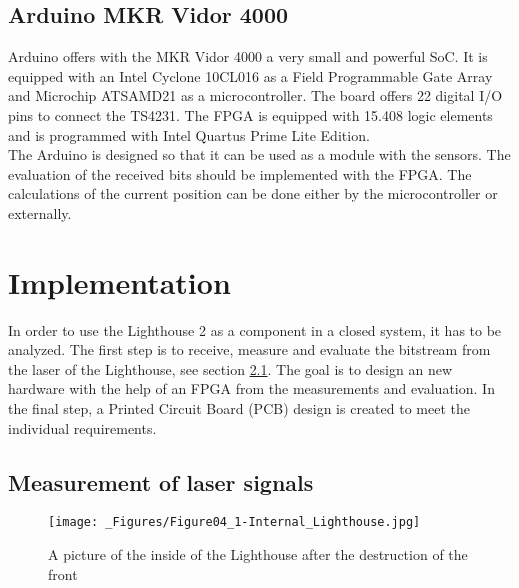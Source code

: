 \documentclass[a4paper,twoside, openright,12pt]{report}
\begin{document}
\section{Arduino MKR Vidor 4000}
\label{Section_Arduino}
Arduino offers with the MKR Vidor 4000 a very small and powerful SoC. It is equipped with an Intel Cyclone 10CL016 as a Field Programmable Gate Array and Microchip ATSAMD21 as a microcontroller. The board offers 22 digital I/O pins to connect the TS4231. The FPGA is equipped with 15.408 logic elements and is programmed with Intel Quartus Prime Lite Edition. \\
The Arduino is designed so that it can be used as a module with the sensors. The evaluation of the received bits should be implemented with the FPGA. The calculations of the current position can be done either by the microcontroller or externally. \cite{.e} \cite{IntelCorporation.} \cite{IntelCorporation.2017} \cite{MicrochipTechnologyInc..2018}


\chapter{Implementation}
\label{Chapter_Implementation}
In order to use the Lighthouse 2 as a component in a closed system, it has to be analyzed. The first step is to receive, measure and evaluate the bitstream from the laser of the Lighthouse, see section \ref{Lighthouse_inside}. The goal is to design an new hardware with the help of an FPGA from the measurements and evaluation. In the final step, a Printed Circuit Board (PCB) design is created to meet the individual requirements.

\section{Measurement of laser signals}
\label{Section_Measurement}

\label{Signal_Measurement}
\begin{figure}[h]
\begin{center}
\texttt{[image: \_Figures/Figure04\_1-Internal\_Lighthouse.jpg]}
\caption{A picture of the inside of the Lighthouse after the destruction of the front \cite{.b}}
\label{Lighthouse_inside}
\end{center}
\end{figure}
\end{document}
